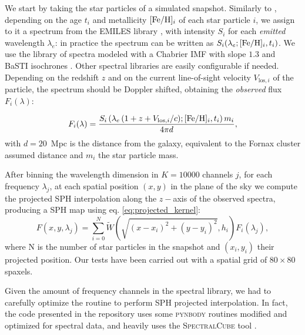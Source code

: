 We start by taking the star particles of a simulated snapshot.
Similarly to \citet{Ibarra-Medel2019}, depending on the age $t_i$ and metallicity $[\text{Fe}/\text{H}]_i$ of each star particle $i$, we assign to it a spectrum from the EMILES library \citep{Vazdekis2010}, with intensity $S_i$ for each \emph{emitted} wavelength $\lambda_e$: in practice the spectrum can be written as $S_i(\lambda_e;[\text{Fe}/\text{H}]_i, t_i)$.
We use the library of spectra modeled with a Chabrier IMF with slope $1.3$ and BaSTI isochrones \citep[][Bag of Stellar Tracks and Isochrones]{Pietrinferni2013}.
Other spectral libraries are easily configurable if needed.
Depending on the redshift $z$ and on the current line-of-sight velocity $V_{\mathrm{los},i}$ of the particle, the spectrum should be Doppler shifted, obtaining the \emph{observed} flux $F_i(\lambda)$:

\begin{equation}
  F_i(\lambda) = \frac{S_i\left(\lambda_e\,(1 + z + V_{\mathrm{los},i}/c);[\text{Fe}/\text{H}]_i, t_i \right) m_i }{4\pi d},
  \label{eq:shifted_flux}
\end{equation}
with $d = 20$~Mpc is the distance from the galaxy, equivalent to the Fornax cluster assumed distance and $m_i$ the star particle mass.

After binning the wavelength dimension in $K=10000$ channels $j$, for each frequency $\lambda_j$, at each spatial position $(x,y)$ in the plane of the sky we compute the projected SPH interpolation along the $z-$axis of the observed spectra, producing a SPH map using eq. \eqref{eq:projected_kernel}:
\begin{equation}
  F(x,y, \lambda_j) = \sum_{i=0}^{N} \tilde{W} \left(\sqrt{(x-x_i)^2+(y-y_i)^2}, h_i \right) F_i(\lambda_j),
\end{equation}
where N is the number of star particles in the snapshot and $(x_i, y_i)$ their projected position.
Our tests have been carried out with a spatial grid of $80\times 80$ spaxels.

Given the amount of frequency channels in the spectral library, we had to carefully optimize the routine to perform SPH projected interpolation.
In fact, the code presented in the repository \citet{simifucube} uses some \textsc{pynbody} \citep{Pontzen2013} routines modified and optimized for spectral data, and heavily uses the \textsc{SpectralCube} tool \citep{SpectralCube}.

